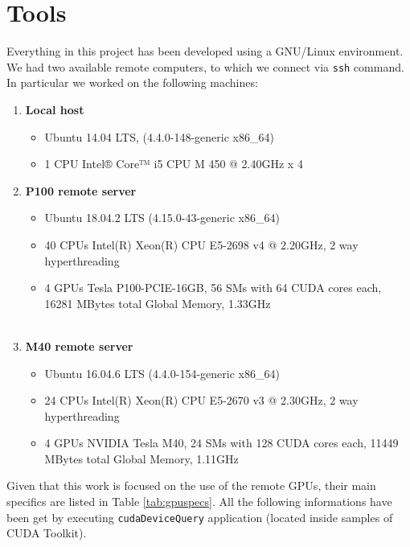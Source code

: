\chapter{Tools} \label{chap:tools}

Everything in this project has been developed using a GNU/Linux environment.
We had two available remote computers, to which we connect via \texttt{ssh} command.\\
In particular we worked on the following machines:
	\begin{enumerate}
		\item \textbf{Local host}
		\begin{itemize} 
			\item Ubuntu 14.04 LTS, (4.4.0-148-generic x86\_64)
			\item 1 CPU Intel® Core™ i5 CPU M 450 @ 2.40GHz x 4 
		\end{itemize}
		
		\item \textbf{P100 remote server}
		\begin{itemize}
			\item Ubuntu 18.04.2 LTS (4.15.0-43-generic x86\_64)	
			\item 40 CPUs Intel(R) Xeon(R) CPU E5-2698 v4 @ 2.20GHz, 2 way hyperthreading	
			\item 4 GPUs Tesla P100-PCIE-16GB, 56 SMs with 64 CUDA cores each, 16281 MBytes total Global Memory, 1.33GHz  \\\\
		\end{itemize}
		 
		\item\textbf{ M40 remote server}
		\begin{itemize}
			\item Ubuntu 16.04.6 LTS (4.4.0-154-generic x86\_64)
			\item 24 CPUs Intel(R) Xeon(R) CPU E5-2670 v3 @ 2.30GHz, 2 way hyperthreading	
			\item 4 GPUs NVIDIA Tesla M40, 24 SMs with 128 CUDA cores each, 11449 MBytes total Global Memory, 1.11GHz \\
		\end{itemize}
	\end{enumerate}
	Given that this work is focused on the use of the remote GPUs, their main specifics are listed in Table \ref{tab:gpuspecs}. All the following informations have been get by executing \texttt{cudaDeviceQuery} application (located inside samples of CUDA Toolkit).\\
